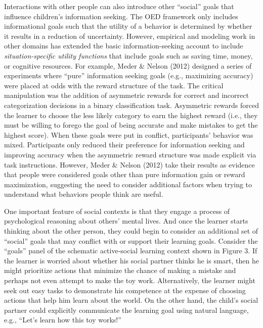 \documentclass[oneside]{report}
\begin{document}
Interactions with other people can also introduce other ``social'' goals
that influence children's information seeking. The OED framework only
includes informational goals such that the utility of a behavior is
determined by whether it results in a reduction of uncertainty. However,
empirical and modeling work in other domains has extended the basic
information-seeking account to include \emph{situation-specific utility
functions} that include goals such as saving time, money, or cognitive
resources. For example, Meder \& Nelson (2012) designed a series of
experiments where ``pure'' information seeking goals (e.g., maximizing
accuracy) were placed at odds with the reward structure of the task. The
critical manipulation was the addition of asymmetric rewards for correct
and incorrect categorization decisions in a binary classification task.
Asymmetric rewards forced the learner to choose the less likely category
to earn the highest reward (i.e., they must be willing to forego the
goal of being accurate and make mistakes to get the highest score). When
these goals were put in conflict, participants' behavior was mixed.
Participants only reduced their preference for information seeking and
improving accuracy when the asymmetric reward structure was made
explicit via task instructions. However, Meder \& Nelson (2012) take
their results as evidence that people were considered goals other than
pure information gain or reward maximization, suggesting the need to
consider additional factors when trying to understand what behaviors
people think are useful.

One important feature of social contexts is that they engage a process
of psychological reasoning about others' mental lives. And once the
learner starts thinking about the other person, they could begin to
consider an additional set of ``social'' goals that may conflict with or
support their learning goals. Consider the ``goals'' panel of the
schematic active-social learning context shown in Figure 3. If the
learner is worried about whether his social partner thinks he is smart,
then he might prioritize actions that minimize the chance of making a
mistake and perhaps not even attempt to make the toy work.
Alternatively, the learner might seek out easy tasks to demonstrate his
competence at the expense of choosing actions that help him learn about
the world. On the other hand, the child's social partner could
explicitly communicate the learning goal using natural language, e.g.,
``Let's learn how this toy works!''
\end{document}
